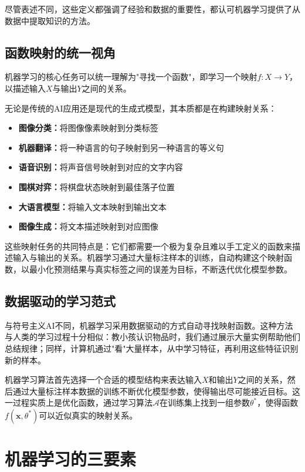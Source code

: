 尽管表述不同，这些定义都强调了经验和数据的重要性，都认可机器学习提供了从数据中提取知识的方法。

\subsection{函数映射的统一视角}

机器学习的核心任务可以统一理解为"寻找一个函数"，即学习一个映射$f: X \rightarrow Y$，以描述输入$X$与输出$Y$之间的关系。

无论是传统的AI应用还是现代的生成式模型，其本质都是在构建映射关系：

\begin{itemize}
\item \textbf{图像分类：}将图像像素映射到分类标签
\item \textbf{机器翻译：}将一种语言的句子映射到另一种语言的等义句
\item \textbf{语音识别：}将声音信号映射到对应的文字内容
\item \textbf{围棋对弈：}将棋盘状态映射到最佳落子位置
\item \textbf{大语言模型：}将输入文本映射到输出文本
\item \textbf{图像生成：}将文本描述映射到对应图像
\end{itemize}

这些映射任务的共同特点是：它们都需要一个极为复杂且难以手工定义的函数来描述输入与输出的关系。机器学习通过大量标注样本的训练，自动构建这个映射函数，以最小化预测结果与真实标签之间的误差为目标，不断迭代优化模型参数。

\subsection{数据驱动的学习范式}

与符号主义AI不同，机器学习采用数据驱动的方式自动寻找映射函数。这种方法与人类的学习过程十分相似：教小孩认识物品时，我们通过展示大量实例帮助他们总结规律；同样，计算机通过"看"大量样本，从中学习特征，再利用这些特征识别新的样本。

机器学习算法首先选择一个合适的模型结构来表达输入$X$和输出$Y$之间的关系，然后通过大量标注样本数据的训练不断优化模型参数，使得输出尽可能接近目标。这一过程实质上是优化函数，通过学习算法$\mathcal{A}$在训练集上找到一组参数$\theta^*$，使得函数$f(\mathbf{x}, \theta^*)$可以近似真实的映射关系。

\section{机器学习的三要素}

